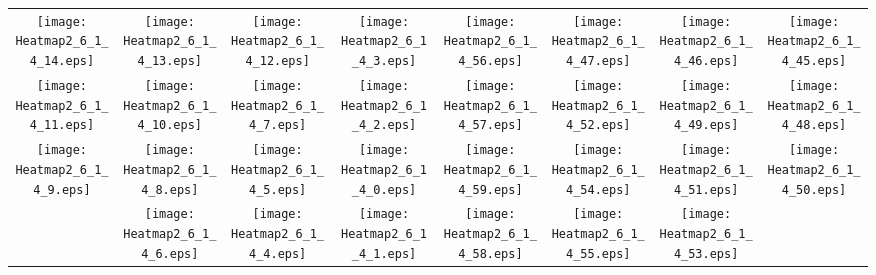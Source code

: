 \documentclass{standalone}
\begin{document}
\begin{tabular}{ *8{c} }
\texttt{[image: Heatmap2\_6\_1\_4\_14.eps]} & \texttt{[image: Heatmap2\_6\_1\_4\_13.eps]} & \texttt{[image: Heatmap2\_6\_1\_4\_12.eps]} & \texttt{[image: Heatmap2\_6\_1\_4\_3.eps]} & \texttt{[image: Heatmap2\_6\_1\_4\_56.eps]} & \texttt{[image: Heatmap2\_6\_1\_4\_47.eps]} & \texttt{[image: Heatmap2\_6\_1\_4\_46.eps]} & \texttt{[image: Heatmap2\_6\_1\_4\_45.eps]} \\
\texttt{[image: Heatmap2\_6\_1\_4\_11.eps]} & \texttt{[image: Heatmap2\_6\_1\_4\_10.eps]} & \texttt{[image: Heatmap2\_6\_1\_4\_7.eps]} & \texttt{[image: Heatmap2\_6\_1\_4\_2.eps]} & \texttt{[image: Heatmap2\_6\_1\_4\_57.eps]} & \texttt{[image: Heatmap2\_6\_1\_4\_52.eps]} & \texttt{[image: Heatmap2\_6\_1\_4\_49.eps]} & \texttt{[image: Heatmap2\_6\_1\_4\_48.eps]} \\
\texttt{[image: Heatmap2\_6\_1\_4\_9.eps]} & \texttt{[image: Heatmap2\_6\_1\_4\_8.eps]} & \texttt{[image: Heatmap2\_6\_1\_4\_5.eps]} & \texttt{[image: Heatmap2\_6\_1\_4\_0.eps]} & \texttt{[image: Heatmap2\_6\_1\_4\_59.eps]} & \texttt{[image: Heatmap2\_6\_1\_4\_54.eps]} & \texttt{[image: Heatmap2\_6\_1\_4\_51.eps]} & \texttt{[image: Heatmap2\_6\_1\_4\_50.eps]} \\
 & \texttt{[image: Heatmap2\_6\_1\_4\_6.eps]} & \texttt{[image: Heatmap2\_6\_1\_4\_4.eps]} & \texttt{[image: Heatmap2\_6\_1\_4\_1.eps]} & \texttt{[image: Heatmap2\_6\_1\_4\_58.eps]} & \texttt{[image: Heatmap2\_6\_1\_4\_55.eps]} & \texttt{[image: Heatmap2\_6\_1\_4\_53.eps]} &  
\end{tabular}
\end{document}
